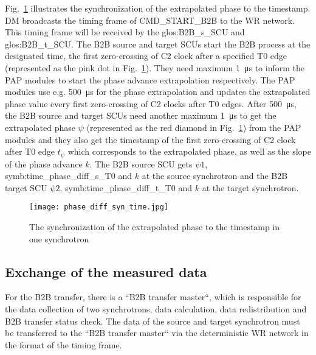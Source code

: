 Fig.~\ref{phase_diff_syn_time} illustrates the synchronization of the extrapolated phase to the timestamp. DM broadcasts the timing frame of CMD\_START\_B2B to the WR network. This timing frame will be received by the \gls{glos:B2B_s_SCU} and \gls{glos:B2B_t_SCU}. The B2B source and target SCUs start the B2B process at the designated time, the first zero-crossing of C2 clock after a specified T0 edge (represented as the pink dot in Fig.~\ref{phase_diff_syn_time}). They need maximum \SI{1}{\us} to inform the PAP modules to start the phase advance extrapolation respectively. The PAP modules use e.g. \SI{500}{\us} for the phase extrapolation and updates the extrapolated phase value every first zero-crossing of C2 clocks after T0 edges. After \SI{500}{\us}, the B2B source and target SCUs need another maximum \SI{1}{\us} to get the extrapolated phase $\psi$ (represented as the red diamond in Fig.~\ref{phase_diff_syn_time}) from the PAP modules and they also get the timestamp of the first zero-crossing of C2 clock after T0 edge $t_{\psi}$ which corresponds to the extrapolated phase, as well as the slope of the phase advance $k$. The B2B source SCU gets $\psi1$, \gls{symb:time_phase_diff_s_T0} and $k$ at the source synchrotron and the B2B target SCU $\psi2$, \gls{symb:time_phase_diff_t_T0} and $k$ at the target synchrotron.
 \begin{figure}[!htb]
   \centering   
   \texttt{[image: phase\_diff\_syn\_time.jpg]}
   \caption{The synchronization of the extrapolated phase to the timestamp in one synchrotron}
   \label{phase_diff_syn_time}
\end{figure}
\subsection{Exchange of the measured data}

For the B2B transfer, there is a ``B2B transfer master``, which is responsible for the data collection of two synchrotrons, data calculation, data redistribution and B2B transfer status check. The data of the source and target synchrotron must be transferred to the ``B2B transfer master`` via the deterministic WR network in the format of the timing frame.
 
